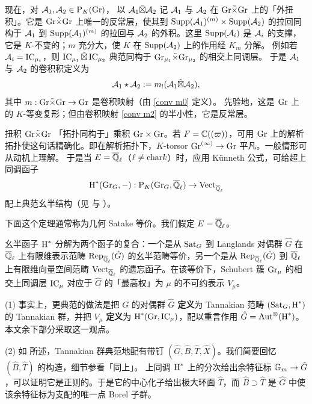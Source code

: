 现在，对 $\mA_1,\mA_2\in \on{P}_{K}(\Gr)$，
以 $\mA_1\tilde\boxtimes\mA_2$ 记 $\mA_1$ 与 $\mA_2$ 在 $\Gr\tilde\times\Gr$ 上的「外扭积」。它是 $\Gr\tilde\times \Gr$ 上唯一的反常层，使其到 $\on{Supp}(\mA_1)^{(m)}\times \on{Supp}(\mA_2)$ 的拉回同构于 $\mA_1$ 到 $\on{Supp}(\mA_1)^{(m)}$ 的拉回与 $\mA_2$ 的外积。这里 $\on{Supp}(\mA_i)$ 是 $\mA_i$ 的支撑，它是 $K$-不变的；$m$ 充分大，使 $K$ 在 $\on{Supp}(\mA_2)$ 上的作用经 $K_m$ 分解。
例如若 $\mA_i=\IC_{\mu_i}$，则 $\IC_{\mu_1}\tilde\boxtimes\IC_{\mu_2}$ 典范同构于 $\Gr_{\mu_1}\tilde\times\Gr_{\mu_2}$ 的相交上同调层。
于是 $\mA_1$ 与 $\mA_2$ 的卷积积定义为
\begin{equation}\label{Lus conv}
\mA_1\star\mA_2:=m_!(\mA_1\tilde\boxtimes\mA_2),
\end{equation}
其中 $m:\Gr\tilde\times\Gr\to \Gr$ 是卷积映射（由 \eqref{conv m0} 定义）。
先验地，这是 $\Gr$ 上的 $K$-等变复形；但由卷积映射 \eqref{conv m2} 的半小性，它是反常层。

扭积 $\Gr\tilde\times\Gr$ 「拓扑同构于」乘积 $\Gr\times\Gr$。若 $F=\bC((\varpi))$，可用 $\Gr$ 上的解析拓扑使这句话精确化。即在解析拓扑下，$K$-torsor $\Gr^{(\infty)}\to \Gr$ 平凡。一般情形可从动机上理解。
于是当 $E=\Ql$（$\ell\neq \cha k$）时，应用 K\"unneth 公式，可给超上同调函子
$$\on{H}^*(\Gr_G,-) : \on{P}_{K}(\Gr_G,\Ql)\to \on{Vect}_{\Ql}$$ 配上典范幺半结构（见 \cite[\S 2.3]{Zh1} 与 \cite[\S 5.2]{Zh2}）。

下面这个定理通常称为几何 Satake 等价。我们假定 $E=\Ql$。

\begin{thm}\label{intro:geomSat}
幺半函子 $\on{H}^*$ 分解为两个函子的复合：一个是从 $\Sat_G$ 到 Langlands 对偶群 $\hat{G}$ 在 $\Ql$ 上有限维表示范畴 $\on{Rep}_{\Ql}(\hat{G})$ 的幺半范畴等价，另一个是从 $\on{Rep}_{\Ql}(\hat{G})$ 到 $\Ql$ 上有限维向量空间范畴 $\on{Vect}_{\Ql}$ 的遗忘函子。在该等价下，Schubert 簇 $\Gr_\mu$ 的相交上同调层 $\IC_\mu$ 对应于 $\hat G$ 的「最高权」为 $\mu$ 的不可约表示 $V_\mu$。
\end{thm}


\begin{rmk}
\label{R: birth of the dual group}
(1) 事实上，更典范的做法是把 $G$ 的对偶群 $\hat G$ \textbf{定义}为 Tannakian 范畴 $(\Sat_G,\on{H}^*)$ 的 Tannakian 群，并把 $V_\mu$ \textbf{定义}为 $\on{H}^*(\Gr,\IC_\mu)$，配以重言作用 $\hat G=\Aut^\otimes(\on{H}^*)$。本文余下部分采取这一观点。

(2) 如 \cite[\S 5.3]{Zh2} 所述，Tannakian 群典范地配有带钉 $(\hat G, \hat B, \hat T, \hat X)$。我们简要回忆 $(\hat B, \hat T)$ 的构造，细节参看「同上」。
上同调 $\on{H}^*$ 上的分次给出余特征标 $\bG_m\to \hat G$，可以证明它是正则的。于是它的中心化子给出极大环面 $\hat T$，而 $\hat B\supset \hat T$ 是 $\hat G$ 中使该余特征标为支配的唯一点 Borel 子群。
\end{rmk}

